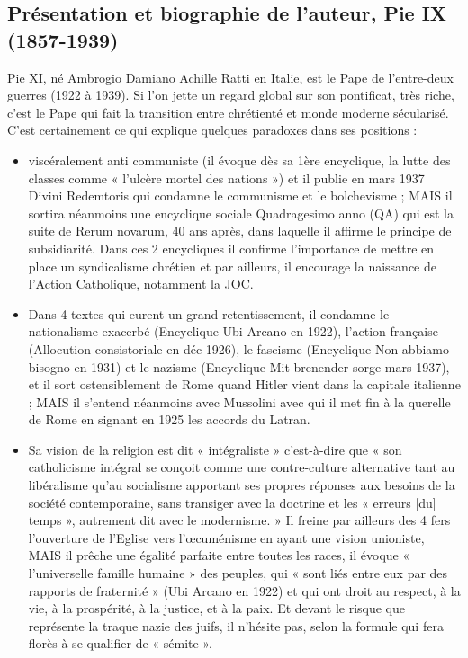 \subsection{Présentation et biographie de l’auteur, Pie IX (1857-1939)}	

Pie XI, né Ambrogio Damiano Achille Ratti en Italie, est le Pape de l’entre-deux guerres (1922 à 1939). Si l’on jette un regard global sur son pontificat, très riche, c’est le Pape qui fait la transition entre chrétienté et monde moderne sécularisé. C’est certainement ce qui explique quelques paradoxes dans ses positions : 
\begin{itemize}
    \item  viscéralement anti communiste (il évoque dès sa 1ère encyclique, la lutte des classes comme « l’ulcère mortel des nations ») et il publie en mars 1937 Divini Redemtoris qui condamne le communisme et le bolchevisme  ; MAIS il sortira néanmoins une encyclique sociale Quadragesimo anno (QA) qui est la suite de Rerum novarum, 40 ans après, dans laquelle il affirme le principe de subsidiarité. Dans ces 2 encycliques il confirme l’importance de mettre en place un syndicalisme chrétien et par ailleurs, il encourage la naissance de l’Action Catholique, notamment la JOC.                        
  \item  Dans 4 textes qui eurent un grand retentissement, il condamne le nationalisme exacerbé (Encyclique Ubi Arcano en 1922), l’action française (Allocution consistoriale en déc 1926), le fascisme (Encyclique Non abbiamo bisogno en 1931) et le nazisme (Encyclique Mit brenender sorge mars 1937), et il sort ostensiblement de Rome quand Hitler vient dans la capitale italienne ; MAIS il s’entend néanmoins avec Mussolini avec qui il met fin à la querelle de Rome en signant en 1925 les accords du Latran. 
  \item  Sa vision de la religion est dit « intégraliste » c’est-à-dire que « son catholicisme intégral se conçoit comme une contre-culture alternative tant au libéralisme qu’au socialisme apportant ses propres réponses aux besoins de la société contemporaine, sans transiger avec la doctrine et les « erreurs [du] temps », autrement dit avec le modernisme. » Il freine par ailleurs des 4 fers l’ouverture de l’Eglise vers l’œcuménisme en ayant une vision unioniste, MAIS il prêche une égalité parfaite entre toutes les races, il évoque « l’universelle famille humaine » des peuples, qui « sont liés entre eux par des rapports de fraternité » (Ubi Arcano en 1922) et qui ont droit au respect, à la vie, à la prospérité, à la justice, et à la paix. Et devant le risque que représente la traque nazie des juifs, il n’hésite pas, selon la formule qui fera florès à se qualifier de « sémite ». 
\end{itemize}

